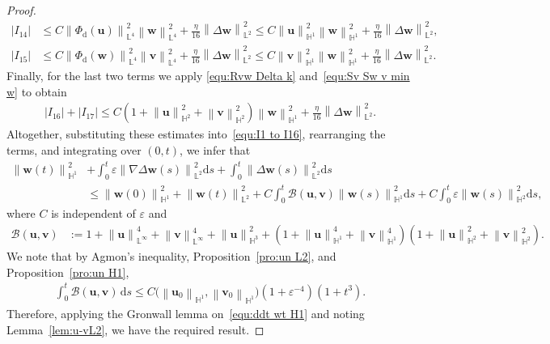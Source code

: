 \documentclass[11pt, reqno]{amsart}
\theoremstyle{definition}
\numberwithin{equation}{section}
\newcommand{\bff}{\boldsymbol}
\newcommand{\bb}{\mathbb}
\newcommand{\ds}{\mathrm{d}s}
\newcommand{\norm}[2]{\left\|{#1}\right\|_{#2}}
\newcommand{\abs}[1]{\left|{#1}\right|}
\begin{document}
\begin{proof}
\begin{align*}
    \abs{I_{14}}
    &\leq
    C\norm{\Phi_{\mathrm{d}}(\bff{u})}{\bb{L}^4}^2 \norm{\bff{w}}{\bb{L}^4}^2
    +
    \frac{\eta}{16} \norm{\Delta \bff{w}}{\bb{L}^2}^2
    \leq
    C \norm{\bff{u}}{\bb{H}^1}^2 \norm{\bff{w}}{\bb{H}^1}^2
    +
    \frac{\eta}{16} \norm{\Delta \bff{w}}{\bb{L}^2}^2,
    \\
    \abs{I_{15}}
    &\leq
    C\norm{\Phi_{\mathrm{d}}(\bff{w})}{\bb{L}^4}^2 \norm{\bff{v}}{\bb{L}^4}^2
    +
    \frac{\eta}{16} \norm{\Delta \bff{w}}{\bb{L}^2}^2
    \leq
    C \norm{\bff{v}}{\bb{H}^1}^2 \norm{\bff{w}}{\bb{H}^1}^2
    +
    \frac{\eta}{16} \norm{\Delta \bff{w}}{\bb{L}^2}^2.
\end{align*}
Finally, for the last two terms we apply \eqref{equ:Rvw Delta k} and~\eqref{equ:Sv Sw v min w} to obtain
\begin{align*}
    \abs{I_{16}}+\abs{I_{17}}
    \leq
    C\left(1+\norm{\bff{u}}{\bb{H}^2}^2 + \norm{\bff{v}}{\bb{H}^2}^2\right) \norm{\bff{w}}{\bb{H}^1}^2
    +
    \frac{\eta}{16} \norm{\Delta \bff{w}}{\bb{L}^2}^2.
\end{align*}
Altogether, substituting these estimates into~\eqref{equ:I1 to I16}, rearranging the terms, and integrating over $(0,t)$, we infer that
\begin{align}\label{equ:ddt wt H1}
    \norm{\bff{w}(t)}{\bb{H}^1}^2
    &+
    \int_0^t \varepsilon \norm{\nabla \Delta \bff{w}(s)}{\bb{L}^2}^2 \ds
    +
    \int_0^t \norm{\Delta \bff{w}(s)}{\bb{L}^2}^2 \ds
    \nonumber\\
    &\leq
    \norm{\bff{w}(0)}{\bb{H}^1}^2
    +
    \norm{\bff{w}(t)}{\bb{L}^2}^2
    +
    C \int_0^t \mathcal{B}(\bff{u},\bff{v}) \norm{\bff{w}(s)}{\bb{H}^1}^2 \ds
    +
    C \int_0^t \varepsilon \norm{\bff{w}(s)}{\bb{H}^2}^2 \ds,
\end{align}
where $C$ is independent of $\varepsilon$ and
\begin{align*}
    \mathcal{B}(\bff{u},\bff{v})
    &:= 
    1+ \norm{\bff{u}}{\bb{L}^\infty}^4 + \norm{\bff{v}}{\bb{L}^\infty}^4
    +
    \norm{\bff{u}}{\bb{H}^3}^2 
    + 
    \left(1+ \norm{\bff{u}}{\bb{H}^1}^4 + \norm{\bff{v}}{\bb{H}^1}^4 \right) \left(1+\norm{\bff{u}}{\bb{H}^2}^2 + \norm{\bff{v}}{\bb{H}^2}^2 \right).
\end{align*}
We note that by Agmon's inequality, Proposition~\ref{pro:un L2}, and Proposition~\ref{pro:un H1},
\begin{align*}
\int_0^t \mathcal{B}(\bff{u},\bff{v}) \,\ds 
\leq
C\big(\norm{\bff{u}_0}{\bb{H}^1}, \norm{\bff{v}_0}{\bb{H}^1}\big)\left(1+ \varepsilon^{-4}\right) (1+t^3).
\end{align*}
Therefore, applying the Gronwall lemma on~\eqref{equ:ddt wt H1} and noting Lemma~\ref{lem:u-vL2}, we have the required result.
\end{proof}
\end{document}
